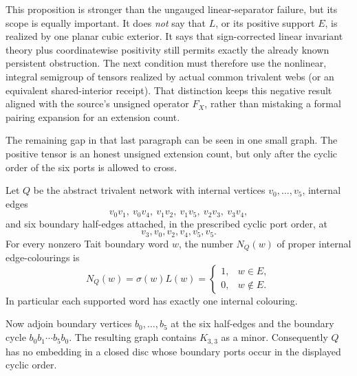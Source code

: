 This proposition is stronger than the ungauged linear-separator failure, but
its scope is equally important.  It does \emph{not} say that $L$, or its
positive support $E$, is realized by one planar cubic exterior.  It says
that sign-corrected linear invariant theory plus coordinatewise positivity
still permits exactly the already known persistent obstruction.  The next
condition must therefore use the nonlinear, integral semigroup of tensors
realized by actual common trivalent webs (or an equivalent shared-interior
receipt).  That distinction keeps this negative result aligned with the
source's unsigned operator $F_X$, rather than mistaking a formal pairing
expansion for an extension count.

The remaining gap in that last paragraph can be seen in one small graph.
The positive tensor is an honest unsigned extension count, but only after the
cyclic order of the six ports is allowed to cross.

\begin{proposition}
\label{prop:hexagon-crossed-pentagon-leaf-adversary}
Let $Q$ be the abstract trivalent network with internal vertices
$v_0,\ldots,v_5$, internal edges
\[
 v_0v_1,\ v_0v_4,\ v_1v_2,\ v_1v_5,\ v_2v_3,\ v_3v_4,
\]
and six boundary half-edges attached, in the prescribed cyclic port order,
at
\[
                         v_3,v_0,v_2,v_4,v_5,v_5.
\]
For every nonzero Tait boundary word $w$, the number $N_Q(w)$ of proper
internal edge-colourings is
\[
              N_Q(w)=\sigma(w)L(w)=
              \begin{cases}1,&w\in E,\\0,&w\notin E.\end{cases}
\]
In particular each supported word has exactly one internal colouring.

Now adjoin boundary vertices $b_0,\ldots,b_5$ at the six half-edges and the
boundary cycle $b_0b_1\cdots b_5b_0$.  The resulting graph contains
$K_{3,3}$ as a minor.  Consequently $Q$ has no embedding in a closed disc
whose boundary ports occur in the displayed cyclic order.
\end{proposition}

